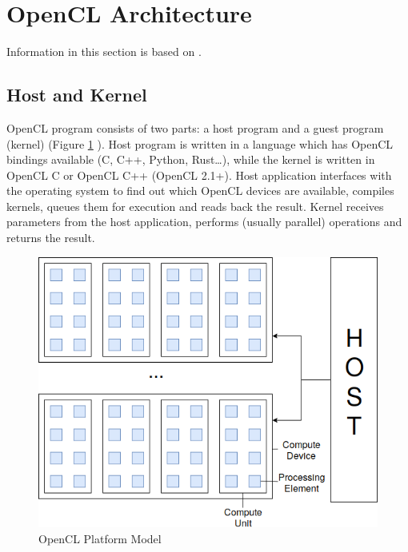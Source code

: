 
\section{OpenCL Architecture}

Information in this section is based on \cite{gaster2012heterogeneous}.

\subsection{Host and Kernel}

OpenCL program consists of two parts: a host program and a guest program (kernel) (Figure \ref{fig:openclplatform} \cite{munshi2009opencl}). Host program is written in a language which has OpenCL bindings available (C, C++, Python, Rust\dots), while the kernel is written in OpenCL C or OpenCL C++ (OpenCL 2.1+). Host application interfaces with the operating system to find out which OpenCL devices are available, compiles kernels, queues them for execution and reads back the result. Kernel receives parameters from the host application, performs (usually parallel) operations and returns the result.

\begin{figure}[h]
    \includegraphics[width=\linewidth]{Figures/openclarch.png}
    \caption{OpenCL Platform Model}
    \label{fig:openclplatform}
\end{figure}

